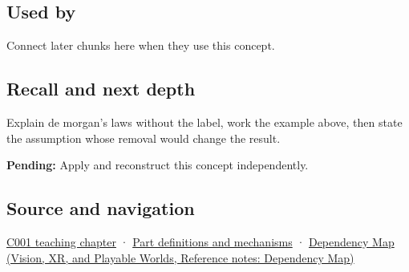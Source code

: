 \subsection{Used by}\label{appendix-9079d3659da4-used-by}

\hypertarget{appendix-9079d3659da4-used-by}{}

Connect later chunks here when they use this concept.

\subsection{Recall and next depth}\label{appendix-9079d3659da4-recall-and-next-depth}

\hypertarget{appendix-9079d3659da4-recall-and-next-depth}{}

Explain de morgan's laws without the label, work the example above, then state the assumption whose removal would change the result.

\textbf{Pending:} Apply and reconstruct this concept independently.

\subsection{Source and navigation}\label{appendix-9079d3659da4-source-and-navigation}

\hypertarget{appendix-9079d3659da4-source-and-navigation}{}

\hyperref[01-foundations-i-ch001-from-a-signal-to-an-interpretation]{C001 teaching chapter} · \hyperref[appendix-fd090d982a15]{Part definitions and mechanisms} · \href{../07-Vision-XR-and-Playable-Worlds/main.pdf\#nameddest=appendix-4ad47bdd269a}{Dependency Map (Vision, XR, and Playable Worlds, Reference notes: Dependency Map)}
